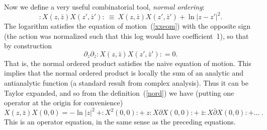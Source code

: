 Now we define a very useful combinatorial tool, {\it normal
ordering}:
\begin{equation}
{ :\! X(z,\bar z)  X(z',\bar z') \! : }\ \equiv\ 
X(z,\bar z)  X(z',\bar z') + \ln|z-z'|^2.  \label{nord}
\end{equation}
The logarithm satisfies the equation of motion~(\ref{xxeom})
with the opposite sign
(the action was normalized such that this log would have
coefficient~1), so that by construction
\begin{equation}
\partial_z
\partial_{\bar z} { :\! X(z,\bar z)  X(z',\bar z') \! : }
= 0 .  \label{neom}
\end{equation}
That is, the normal ordered product satisfies the naive equation
of motion.  This implies that the 
normal ordered product is locally the sum of an
analytic and antianalytic function (a standard result from complex
analysis).  Thus it can be Taylor expanded, and so from the
definition~(\ref{nord}) we have (putting one operator
at the origin for convenience)
\begin{equation}
X(z,\bar z)  X(0,0) = - \ln|z|^2
\ + :\! X^2(0,0) \! : +\ z :\! X\partial X(0,0) \!:  +\ \bar z :\!
X \bar\partial X(0,0) \! : +
\ldots\ .
\label{xxop}
\end{equation}
This is an operator equation, in the same sense as the preceding
equations.

